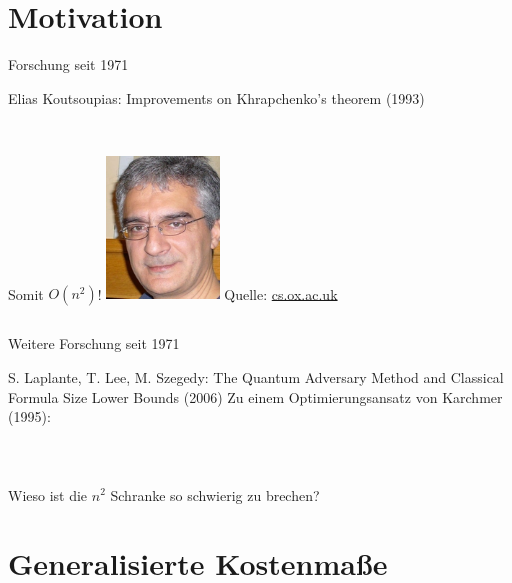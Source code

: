 \section{Motivation}
\begin{frame}{Forschung seit 1971}
    \begin{block}{Elias Koutsoupias: Improvements on Khrapchenko's theorem (1993)}
    \begin{columns}[onlytextwidth,T]
      \column{\dimexpr\linewidth-30mm-5mm}
        \\\vspace*{1cm}
        Somit $O(n^2)$!
      \column{30mm}
      \includegraphics[width=30mm]{Koutsoupias.jpg}
      Quelle: \url{cs.ox.ac.uk}
      \end{columns}
    \end{block}
\end{frame}

\begin{frame}{Weitere Forschung seit 1971}
    \begin{block}{S. Laplante, T. Lee, M. Szegedy: The Quantum Adversary Method and Classical Formula Size Lower Bounds (2006)}
        Zu einem Optimierungsansatz von Karchmer (1995):\\~\\
        \\~\\
        \pause
        Wieso ist die $n^2$ Schranke so schwierig zu brechen?
    \end{block}
\end{frame}



\section{Generalisierte Kostenma\ss{}e}

